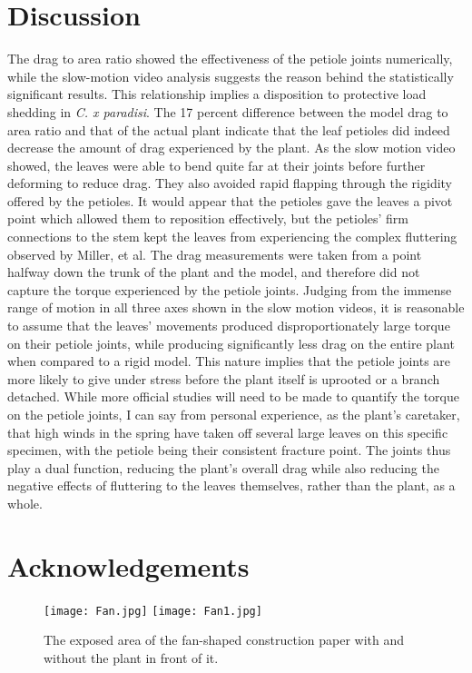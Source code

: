 \documentclass[]{article}
\begin{document}
\section{Discussion}
	The drag to area ratio showed the effectiveness of the petiole joints numerically, while the slow-motion video analysis suggests the reason behind the statistically significant results. This relationship implies a disposition to protective load shedding in \emph{C. x paradisi}.
	The 17 percent difference between the model drag to area ratio and that of the actual plant indicate that the leaf petioles did indeed decrease the amount of drag experienced by the plant. As the slow motion video showed, the leaves were able to bend quite far at their joints before further deforming to reduce drag. They also avoided rapid flapping through the rigidity offered by the petioles. It would appear that the petioles gave the leaves a pivot point which allowed them to reposition effectively, but the petioles' firm connections to the stem kept the leaves from experiencing the complex fluttering observed by Miller, et al.
    The drag measurements were taken from a point halfway down the trunk of the plant and the model, and therefore did not capture the torque experienced by the petiole joints. Judging from the immense range of motion in all three axes shown in the slow motion videos, it is reasonable to assume that the leaves' movements produced disproportionately large torque on their petiole joints, while producing significantly less drag on the entire plant when compared to a rigid model. This nature implies that the petiole joints are more likely to give under stress before the plant itself is uprooted or a branch detached. While more official studies will need to be made to quantify the torque on the petiole joints, I can say from personal experience, as the plant's caretaker, that high winds in the spring have taken off several large leaves on this specific specimen, with the petiole being their consistent fracture point. The joints thus play a dual function, reducing the plant's overall drag while also reducing the negative effects of fluttering to the leaves themselves, rather than the plant, as a whole.

\section{Acknowledgements}



\clearpage
\appendix
\begin{figure}
\begin{center}
\texttt{[image: Fan.jpg]}
\texttt{[image: Fan1.jpg]}
\end{center}
\caption{The exposed area of the fan-shaped construction paper with and without the plant in front of it.}
\label{fig:Appendix1}
\end{figure}
\end{document}
